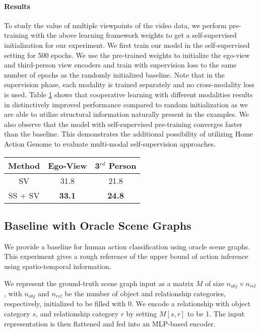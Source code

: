 \documentclass[final]{cvpr}
\begin{document}
\paragraph{Results} To study the value of multiple viewpoints of the video data, we perform pre-training with the above learning framework weights to get a self-supervised initialization for our experiment. We first train our model in the self-supervised setting for 500 epochs. We use the pre-trained weights to initialize the ego-view and third-person view encoders and train with supervision loss to the same number of epochs as the randomly initialized baseline. Note that in the supervision phase, each modality is trained separately and no cross-modality loss is used. Table \ref{table:self_sup} shows that cooperative learning with different modalities results in distinctively improved performance compared to random initialization as we are able to utilize structural information naturally present in the examples. We also observe that the model with self-supervised pre-training converges faster than the baseline. This demonstrates the additional possibility of utilizing Home Action Genome to evaluate multi-modal self-supervision approaches.

\begin{table}[t]
  \centering
    \begin{tabular}{c|c|c} 
     \toprule
     Method & Ego-View & 3$^{rd}$ Person\\
     \midrule
     SV & 31.8 & 21.8 \\
     SS + SV & \textbf{33.1} & \textbf{24.8} \\
     \bottomrule
    \end{tabular}
    \label{table:self_sup}
\end{table}

\subsection*{Baseline with Oracle Scene Graphs}

We provide a baseline for human action classification using oracle scene graphs. This experiment gives a rough reference of the upper bound of action inference using spatio-temporal information.

We represent the ground-truth scene graph input as a matrix $M$ of size $n_{obj} \times n_{rel}$, with $n_{obj}$ and $n_{rel}$ be the number of object and relationship categories, respectively, initialized to be filled with 0. We encode a relationship with object category $s$, and relationship category $r$ by setting $M[s, r]$ to be 1. The input representation is then flattened and fed into an MLP-based encoder.
\end{document}
